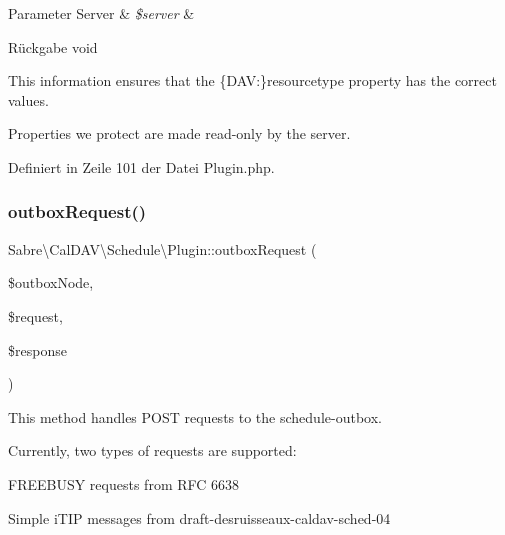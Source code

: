 \begin{DoxyParams}[1]{Parameter}
Server & {\em \$server} & \\
\hline
\end{DoxyParams}
\begin{DoxyReturn}{Rückgabe}
void 
\end{DoxyReturn}
This information ensures that the \{D\+AV\+:\}resourcetype property has the correct values.

Properties we protect are made read-\/only by the server.

Definiert in Zeile 101 der Datei Plugin.\+php.

\mbox{\label{class_sabre_1_1_cal_d_a_v_1_1_schedule_1_1_plugin_acea7407a5d626c516e545cfdfe8f8116}} 
\subsubsection{\texorpdfstring{outbox\+Request()}{outboxRequest()}}
{\footnotesize\ttfamily Sabre\textbackslash{}\+Cal\+D\+A\+V\textbackslash{}\+Schedule\textbackslash{}\+Plugin\+::outbox\+Request (\begin{DoxyParamCaption}\item[{\mbox{\hyperlink{interface_sabre_1_1_cal_d_a_v_1_1_schedule_1_1_i_outbox}{I\+Outbox}}}]{\$outbox\+Node,  }\item[{\mbox{\hyperlink{interface_sabre_1_1_h_t_t_p_1_1_request_interface}{Request\+Interface}}}]{\$request,  }\item[{\mbox{\hyperlink{interface_sabre_1_1_h_t_t_p_1_1_response_interface}{Response\+Interface}}}]{\$response }\end{DoxyParamCaption})}

This method handles P\+O\+ST requests to the schedule-\/outbox.

Currently, two types of requests are supported\+:
\begin{DoxyItemize}
\item F\+R\+E\+E\+B\+U\+SY requests from R\+FC 6638
\item Simple i\+T\+IP messages from draft-\/desruisseaux-\/caldav-\/sched-\/04
\end{DoxyItemize}

